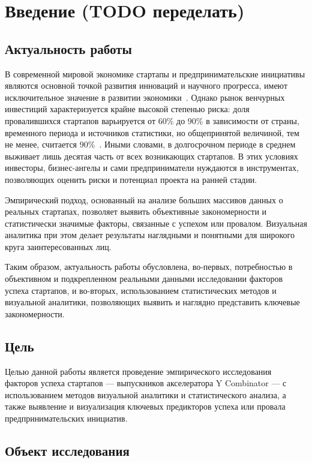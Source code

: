 \section{Введение (TODO переделать)}

\subsection{Актуальность работы}
В современной мировой экономике стартапы и предпринимательские инициативы являются основной точкой развития инноваций и научного прогресса, имеют исключительное значение в развитии экономики~\cite{startups-meaning}. Однако рынок венчурных инвестиций характеризуется крайне высокой степенью риска: доля провалившихся стартапов варьируется от $60\%$ до $90\%$ в зависимости от страны, временного периода и источников статистики, но общепринятой величиной, тем не менее, считается $90\%$~\cite{failurerate}. Иными словами, в долгосрочном периоде в среднем выживает лишь десятая часть от всех возникающих стартапов. В этих условиях инвесторы, бизнес-ангелы и сами предприниматели нуждаются в инструментах, позволяющих оценить риски и потенциал проекта на ранней стадии.

Эмпирический подход, основанный на анализе больших массивов данных о реальных стартапах, позволяет выявить объективные закономерности и статистически значимые факторы, связанные с успехом или провалом. Визуальная аналитика при этом делает результаты наглядными и понятными для широкого круга заинтересованных лиц.

Таким образом, актуальность работы обусловлена, во-первых, потребностью в объективном и подкрепленном реальными данными исследовании факторов успеха стартапов, и во-вторых, использованием статистических методов и визуальной аналитики, позволяющих выявить и наглядно представить ключевые закономерности.


\subsection{Цель}

Целью данной работы является проведение эмпирического исследования факторов успеха стартапов --- выпускников акселератора Y Combinator --- с использованием методов визуальной аналитики и статистического анализа, а также выявление и визуализация ключевых предикторов успеха или провала предпринимательских инициатив.

\subsection{Объект исследования}

